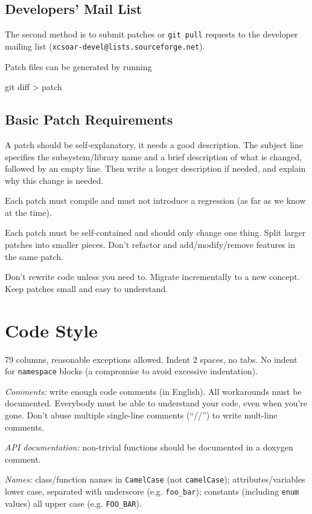\documentclass[a4paper,12pt]{refrep}
\begin{document}
\subsection{Developers' Mail List}
The second method is to submit patches or \texttt{git pull} requests to
the developer mailing list (\texttt{xcsoar-devel@lists.sourceforge.net}).

Patch files can be generated by running
\begin{verbatim*}
git diff > patch
\end{verbatim*}

\subsection{Basic Patch Requirements}
A patch should be self-explanatory, it needs a good description.  The
subject line specifies the subsystem/library name and a brief
description of what is changed, followed by an empty line.  Then write
a longer description if needed, and explain why this change is needed.

Each patch must compile and must not introduce a regression (as far as
we know at the time).

Each patch must be self-contained and should only change one thing.
Split larger patches into smaller pieces.  Don't refactor and
add/modify/remove features in the same patch.

Don't rewrite code unless you need to.  Migrate incrementally to a new
concept.  Keep patches small and easy to understand.

\section{Code Style}

79 columns, reasonable exceptions allowed.  Indent 2 spaces, no tabs.
No indent for \verb|namespace| blocks (a compromise to avoid excessive
indentation).

\emph{Comments:} write enough code comments (in English).  All
workarounds must be documented.  Everybody must be able to understand
your code, even when you're gone.  Don't abuse multiple single-line
comments (``//'') to write mult-line comments.

\emph{API documentation:} non-trivial functions should be documented
in a doxygen comment.

\emph{Names:} class/function names in \texttt{CamelCase} (not
\texttt{camelCase}); attributes/variables lower case, separated with
underscore (e.g. \texttt{foo\_bar}); constants (including
\texttt{enum} values) all upper case (e.g. \texttt{FOO\_BAR}).
\end{document}
